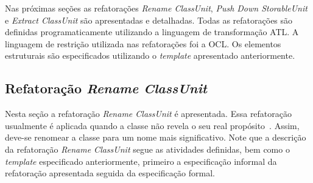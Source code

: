 Nas próximas seções as refatorações \textit{Rename ClassUnit}, \textit{Push Down StorableUnit} e \textit{Extract ClassUnit} são apresentadas e detalhadas. Todas as refatorações são definidas programaticamente utilizando a linguagem de transformação ATL. A linguagem de restrição utilizada nas refatorações foi a OCL. Os elementos estruturais são especificados utilizando o \textit{template} apresentado anteriormente.




\subsection{Refatoração \textit{Rename ClassUnit}}
Nesta seção a refatoração \textit{Rename ClassUnit} é apresentada. Essa refatoração usualmente é aplicada quando a classe não revela o seu real propósito~\cite{Fowler1999}. Assim, deve-se renomear a classe para um nome mais significativo. Note que a descrição da refatoração \textit{Rename ClassUnit} segue as atividades definidas, bem como o \textit{template} especificado anteriormente, primeiro a especificação informal da refatoração apresentada seguida da especificação formal.

